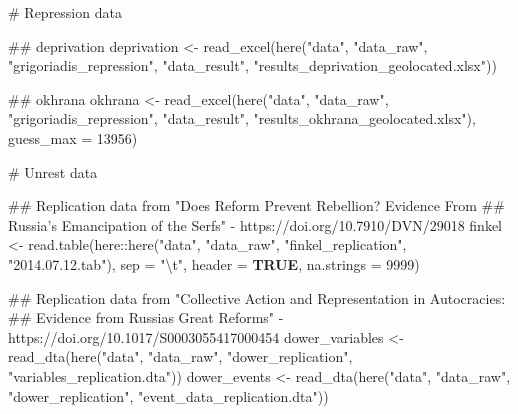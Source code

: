 \documentclass[
  9pt,
  letterpaper,
  DIV=11,
  numbers=noendperiod]{scrartcl}
\newenvironment{Shaded}{\begin{snugshade}}{\end{snugshade}}
\newcommand{\AttributeTok}[1]{\textcolor[rgb]{0.16,0.50,0.73}{#1}}
\newcommand{\CommentTok}[1]{\textcolor[rgb]{0.48,0.49,0.49}{#1}}
\newcommand{\ConstantTok}[1]{\textcolor[rgb]{0.15,0.68,0.68}{\textbf{#1}}}
\newcommand{\DecValTok}[1]{\textcolor[rgb]{0.96,0.45,0.00}{#1}}
\newcommand{\DocumentationTok}[1]{\textcolor[rgb]{0.64,0.20,0.25}{#1}}
\newcommand{\FunctionTok}[1]{\textcolor[rgb]{0.56,0.27,0.68}{#1}}
\newcommand{\NormalTok}[1]{\textcolor[rgb]{0.81,0.81,0.76}{#1}}
\newcommand{\OtherTok}[1]{\textcolor[rgb]{0.15,0.68,0.38}{#1}}
\newcommand{\SpecialCharTok}[1]{\textcolor[rgb]{0.24,0.68,0.91}{#1}}
\newcommand{\StringTok}[1]{\textcolor[rgb]{0.96,0.31,0.31}{#1}}
\begin{document}
\begin{Shaded}
\begin{Highlighting}[]
\CommentTok{\# Repression data}

  \DocumentationTok{\#\# deprivation}
\NormalTok{  deprivation }\OtherTok{\textless{}{-}} \FunctionTok{read\_excel}\NormalTok{(}\FunctionTok{here}\NormalTok{(}\StringTok{"data"}\NormalTok{, }\StringTok{"data\_raw"}\NormalTok{, }\StringTok{"grigoriadis\_repression"}\NormalTok{, }
                                 \StringTok{"data\_result"}\NormalTok{, }
                                 \StringTok{"results\_deprivation\_geolocated.xlsx"}\NormalTok{))}
  
  \DocumentationTok{\#\# okhrana}
\NormalTok{  okhrana }\OtherTok{\textless{}{-}} \FunctionTok{read\_excel}\NormalTok{(}\FunctionTok{here}\NormalTok{(}\StringTok{"data"}\NormalTok{, }\StringTok{"data\_raw"}\NormalTok{, }\StringTok{"grigoriadis\_repression"}\NormalTok{, }
                             \StringTok{"data\_result"}\NormalTok{, }
                             \StringTok{"results\_okhrana\_geolocated.xlsx"}\NormalTok{), }
                        \AttributeTok{guess\_max =} \DecValTok{13956}\NormalTok{)}
  
\CommentTok{\# Unrest data}
  
  \DocumentationTok{\#\# Replication data from "Does Reform Prevent Rebellion? Evidence From }
  \DocumentationTok{\#\# Russia’s Emancipation of the Serfs" {-} https://doi.org/10.7910/DVN/29018}
\NormalTok{  finkel }\OtherTok{\textless{}{-}} \FunctionTok{read.table}\NormalTok{(here}\SpecialCharTok{::}\FunctionTok{here}\NormalTok{(}\StringTok{"data"}\NormalTok{, }\StringTok{"data\_raw"}\NormalTok{, }
                                  \StringTok{"finkel\_replication"}\NormalTok{, }\StringTok{"2014.07.12.tab"}\NormalTok{), }
                     \AttributeTok{sep =} \StringTok{"}\SpecialCharTok{\textbackslash{}t}\StringTok{"}\NormalTok{, }\AttributeTok{header =} \ConstantTok{TRUE}\NormalTok{, }\AttributeTok{na.strings =} \DecValTok{9999}\NormalTok{)}
  
  \DocumentationTok{\#\# Replication data from "Collective Action and Representation in Autocracies: }
  \DocumentationTok{\#\# Evidence from Russia\textquotesingle{}s Great Reforms" {-} https://doi.org/10.1017/S0003055417000454}
\NormalTok{  dower\_variables }\OtherTok{\textless{}{-}} \FunctionTok{read\_dta}\NormalTok{(}\FunctionTok{here}\NormalTok{(}\StringTok{"data"}\NormalTok{, }\StringTok{"data\_raw"}\NormalTok{, }\StringTok{"dower\_replication"}\NormalTok{, }
                                   \StringTok{"variables\_replication.dta"}\NormalTok{))}
\NormalTok{  dower\_events }\OtherTok{\textless{}{-}} \FunctionTok{read\_dta}\NormalTok{(}\FunctionTok{here}\NormalTok{(}\StringTok{"data"}\NormalTok{, }\StringTok{"data\_raw"}\NormalTok{, }\StringTok{"dower\_replication"}\NormalTok{, }
                                \StringTok{"event\_data\_replication.dta"}\NormalTok{))}
  

\end{Highlighting}
\end{Shaded}
\end{document}
